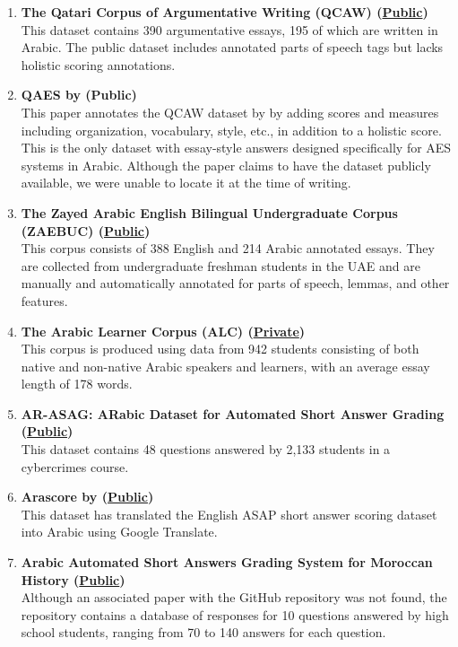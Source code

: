 \documentclass{article}
\begin{document}
	\begin{enumerate}
		\item \textbf{The Qatari Corpus of Argumentative Writing (QCAW) \cite{zaghouani2024qcaw} (\href{https://catalog.ldc.upenn.edu/LDC2022T04}{Public})} \\ 
		This dataset contains 390 argumentative essays, 195 of which are written in Arabic. The public dataset includes annotated parts of speech tags but lacks holistic scoring annotations.
		
		\item \textbf{QAES by \textcite{21_bashendy2024qaes} (Public)} \\ 
		This paper annotates the QCAW dataset by \textcite{zaghouani2024qcaw} by adding scores and measures including organization, vocabulary, style, etc., in addition to a holistic score. This is the only dataset with essay-style answers designed specifically for AES systems in Arabic. Although the paper claims to have the dataset publicly available, we were unable to locate it at the time of writing.
		
		\item \textbf{The Zayed Arabic English Bilingual Undergraduate Corpus (ZAEBUC) \cite{habash2022zaebuc} (\href{https://sites.google.com/view/zaebuc/home}{Public})} \\ 
		This corpus consists of 388 English and 214 Arabic annotated essays. They are collected from undergraduate freshman students in the UAE and are manually and automatically annotated for parts of speech, lemmas, and other features.
		
		\item \textbf{The Arabic Learner Corpus (ALC) (\href{https://www.arabiclearnercorpus.com/}{Private})} \\ 
		This corpus is produced using data from 942 students consisting of both native and non-native Arabic speakers and learners, with an average essay length of 178 words.
		
		\item \textbf{AR-ASAG: ARabic Dataset for Automated Short Answer Grading \cite{ouahrani2020ar-asag} (\href{https://github.com/leilaouahrani/AR-ASAG-Dataset}{Public})} \\ 
		This dataset contains 48 questions answered by 2,133 students in a cybercrimes course.
		
		\item \textbf{Arascore by \textcite{nael2022arascore} (\href{https://github.com/abdelrahmanelnaka/AraScore-Dataset}{Public})} \\ 
		This dataset has translated the English ASAP short answer scoring dataset into Arabic using Google Translate.
		
		\item \textbf{Arabic Automated Short Answers Grading System for Moroccan History (\href{https://github.com/ahmed-bentajhamyani/grading-system}{Public})} \\ 
		Although an associated paper with the GitHub repository was not found, the repository contains a database of responses for 10 questions answered by high school students, ranging from 70 to 140 answers for each question.
	\end{enumerate}
	
\end{document}

